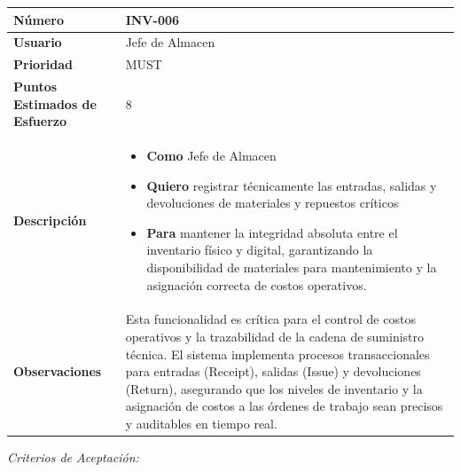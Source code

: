\begin{longtable}{|p{0.21\textwidth}|p{0.74\textwidth}|}\hline
\textbf{Número} & INV-006 \\ \hline
\textbf{Usuario} & Jefe de Almacen \\ \hline
\textbf{Prioridad} & MUST \\ \hline
\textbf{Puntos Estimados de Esfuerzo} & 8 \\ \hline
\textbf{Descripción} & \parbox[t]{\linewidth}{\vspace{2pt}\begin{itemize}[leftmargin=1.5em, nosep, topsep=0pt]
\item \textbf{Como} Jefe de Almacen
\item \textbf{Quiero} registrar técnicamente las entradas, salidas y devoluciones de materiales y repuestos críticos
\item \textbf{Para} mantener la integridad absoluta entre el inventario físico y digital, garantizando la disponibilidad de materiales para mantenimiento y la asignación correcta de costos operativos.
\end{itemize}\vspace{2pt}} \\ \hline
\textbf{Observaciones} & Esta funcionalidad es crítica para el control de costos operativos y la trazabilidad de la cadena de suministro técnica. El sistema implementa procesos transaccionales para entradas (Receipt), salidas (Issue) y devoluciones (Return), asegurando que los niveles de inventario y la asignación de costos a las órdenes de trabajo sean precisos y auditables en tiempo real. \\ \hline
\end{longtable}\normalsize
\noindent\textit{Criterios de Aceptación:}
